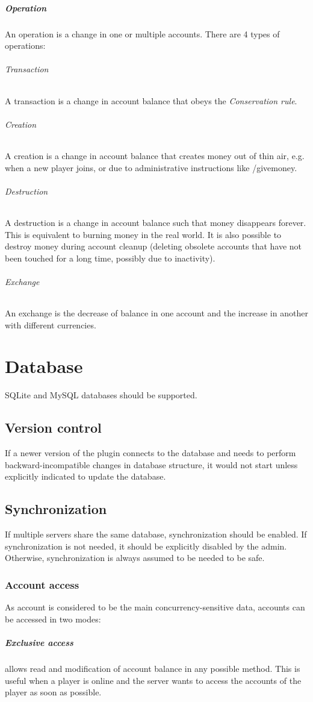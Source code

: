\documentclass{report}
\begin{document}
			\paragraph{Operation}
				An operation is a change in one or multiple accounts. There are 4 types of operations:
				\subparagraph{Transaction} A transaction is a change in account balance that obeys the \textit{Conservation rule}.
				\subparagraph{Creation} A creation is a change in account balance that creates money out of thin air, e.g. when a new player joins, or due to administrative instructions like /givemoney.
				\subparagraph{Destruction} A destruction is a change in account balance such that money disappears forever. This is equivalent to burning money in the real world. It is also possible to destroy money during account cleanup (deleting obsolete accounts that have not been touched for a long time, possibly due to inactivity).
				\subparagraph{Exchange} An exchange is the decrease of balance in one account and the increase in another with different currencies.

		\chapter{Database}
			SQLite and MySQL databases should be supported.

			\section{Version control} If a newer version of the plugin connects to the database and needs to perform backward-incompatible changes in database structure, it would not start unless explicitly indicated to update the database.

			\section{Synchronization}
				If multiple servers share the same database, synchronization should be enabled. If synchronization is not needed, it should be explicitly disabled by the admin. Otherwise, synchronization is always assumed to be needed to be safe.

				\subsection{Account access}
					As account is considered to be the main concurrency-sensitive data, accounts can be accessed in two modes:
					\paragraph{Exclusive access} allows read and modification of account balance in any possible method. This is useful when a player is online and the server wants to access the accounts of the player as soon as possible.
\end{document}
